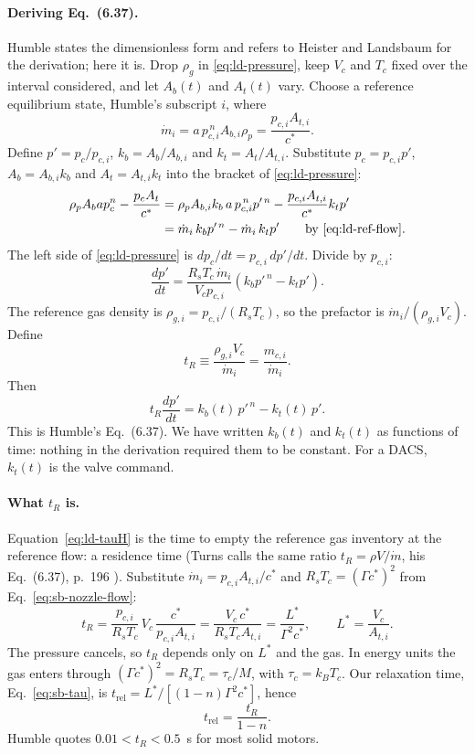 \paragraph{Deriving Eq.~(6.37).} Humble states the dimensionless form
and refers to Heister and Landsbaum for the derivation; here it is.
Drop $\rho_g$ in \eqref{eq:ld-pressure}, keep $V_c$ and $T_c$ fixed over
the interval considered, and let $A_b(t)$ and $A_t(t)$ vary. Choose a
reference equilibrium state, Humble's subscript $i$, where
\begin{equation}\label{eq:ld-ref-flow}
 \dot m_i=a\,p_{c,i}^{\,n}A_{b,i}\rho_p=\frac{p_{c,i}A_{t,i}}{c^*}.
\end{equation}
Define $p'=p_c/p_{c,i}$, $k_b=A_b/A_{b,i}$ and $k_t=A_t/A_{t,i}$.
Substitute $p_c=p_{c,i}p'$, $A_b=A_{b,i}k_b$ and $A_t=A_{t,i}k_t$
into the bracket of \eqref{eq:ld-pressure}:
\begin{align*}
 \rho_pA_bap_c^n-\frac{p_cA_t}{c^*}
 &=\rho_pA_{b,i}k_b\,a\,p_{c,i}^{\,n}p'^{\,n}
   -\frac{p_{c,i}A_{t,i}}{c^*}k_tp'\\
 &=\dot m_i\,k_bp'^{\,n}-\dot m_i\,k_tp'
   \qquad\text{by \eqref{eq:ld-ref-flow}}.
\end{align*}
The left side of \eqref{eq:ld-pressure} is
$dp_c/dt=p_{c,i}\,dp'/dt$. Divide by $p_{c,i}$:
\[
 \frac{dp'}{dt}=\frac{R_sT_c\,\dot m_i}{V_cp_{c,i}}
   \left(k_bp'^{\,n}-k_tp'\right).
\]
The reference gas density is $\rho_{g,i}=p_{c,i}/(R_sT_c)$, so the
prefactor is $\dot m_i/(\rho_{g,i}V_c)$. Define
\begin{equation}\label{eq:ld-tauH}
 t_R\equiv\frac{\rho_{g,i}V_c}{\dot m_i}
 =\frac{m_{c,i}}{\dot m_i}.
\end{equation}
Then
\begin{equation}\label{eq:ld-dimensionless}
 \boxed{t_R\frac{dp'}{dt}=k_b(t)\,p'^{\,n}-k_t(t)\,p'.}
\end{equation}
This is Humble's Eq.~(6.37). We have written $k_b(t)$ and $k_t(t)$
as functions of time: nothing in the derivation required them to be
constant. For a DACS, $k_t(t)$ is the valve command.

\paragraph{What $t_R$ is.} Equation~\eqref{eq:ld-tauH} is the time
to empty the reference gas inventory at the reference flow: a
residence time (Turns calls the same ratio $t_R=\rho V/\dot m$, his
Eq.~(6.37), p.~196 \cite{turns}). Substitute
$\dot m_i=p_{c,i}A_{t,i}/c^*$ and $R_sT_c=(\Gamma c^*)^2$ from
Eq.~\eqref{eq:sb-nozzle-flow}:
\[
 t_R=\frac{p_{c,i}}{R_sT_c}\,V_c\,\frac{c^*}{p_{c,i}A_{t,i}}
 =\frac{V_c\,c^*}{R_sT_cA_{t,i}}
 =\frac{L^*}{\Gamma^2c^*},
 \qquad L^*=\frac{V_c}{A_{t,i}} .
\]
The pressure cancels, so $t_R$ depends only on $L^*$ and the gas.
In energy units the gas enters through $(\Gamma c^*)^2=R_sT_c=\tau_c/M$,
with $\tau_c=k_BT_c$.
Our relaxation time, Eq.~\eqref{eq:sb-tau}, is
$t_{\mathrm{rel}}=L^*/[(1-n)\Gamma^2c^*]$, hence
\begin{equation}\label{eq:ld-tau-relation}
 t_{\mathrm{rel}}=\frac{t_R}{1-n}.
\end{equation}
Humble quotes $0.01<t_R<0.5$~s for most solid motors.

